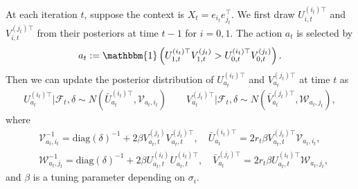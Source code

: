 \documentclass[12pt]{article}
\newcommand{\inp}[2]{\langle #1,#2\rangle}
\def\indicator{\mathbf{1}}
\theoremstyle{plain}
\begin{document}
At each iteration $t$, suppose the context is $X_t=e_{i_t}e_{j_t}^{\top}$. We first draw $U_{i,t}^{(i_t)\top}$ and $V_{i,t}^{(j_t)\top}$ from their posteriors at time $t-1$ for $i=0,1$. The action $a_t$ is selected by
\begin{align*}
    a_t:=\mathbbm{1}\left(U_{1,t}^{(i_t)\top}V_{1,t}^{(j_t)} > U_{0,t}^{(i_t)\top}V_{0,t}^{(j_t)}\right).
\end{align*}
Then we can update the posterior distribution of $U_{a_t}^{(i_t)\top}$ and $V_{a_t}^{(j_t)\top}$ at time $t$ as
\begin{align*}
    U_{a_t}^{(i_t)\top}\big| \mathcal{F}_t,\delta \sim N(\bar{U}_{a_t}^{(i_t)\top}, \mathcal{V}_{a_t,i_t}) \quad\quad  V_{a_t}^{(j_t)\top}\big| \mathcal{F}_t,\delta \sim N(\bar{V}_{a_t}^{(j_t)\top}, \mathcal{W}_{a_t,j_t}), 
\end{align*}
where 
\begin{align*}
    &\mathcal{V}_{a_t,i_t}^{-1}= \text{diag}(\delta)^{-1} + 2\beta V_{a_t,t}^{(j_t)}V_{a_t,t}^{(j_t)\top}, \quad \bar{U}_{a_t}^{(i_t)\top}= 2r_t\beta V_{a_t,t}^{(j_t)\top}\mathcal{V}_{a_t,i_t}, \\
    & \mathcal{W}_{a_t,j_t}^{-1}= \text{diag}(\delta)^{-1} + 2\beta U_{a_t,t}^{(i_t)}U_{a_t,t}^{(i_t)\top}, \quad \bar{V}_{a_t}^{(j_t)\top}= 2r_t\beta U_{a_t,t}^{(i_t)\top}\mathcal{W}_{a_t,j_t},
\end{align*}
and $\beta$ is a tuning parameter depending on $\sigma_i$. 


\end{document}
